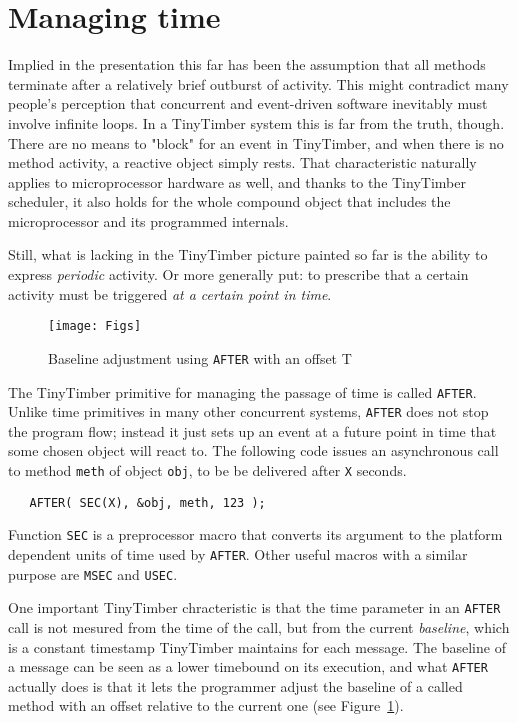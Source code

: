 \documentclass[12pt]{article}
\begin{document}
\section{Managing time}
\label{sect:time}

Implied in the presentation this far has been the assumption that all methods terminate after a relatively brief outburst of activity.  This might contradict many people's perception that concurrent and event-driven software inevitably must involve infinite loops.  In a TinyTimber system this is far from the truth, though.  There are no means to "block" for an event in TinyTimber, and when there is no method activity, a reactive object simply rests.  That characteristic naturally applies to microprocessor hardware as well, and thanks to the TinyTimber scheduler, it also holds for the whole compound object that includes the microprocessor and its programmed internals.

Still, what is lacking in the TinyTimber picture painted so far is the ability to express {\em periodic} activity.  Or more generally put: to prescribe that a certain activity must be triggered {\em at a certain point in time}.

\begin{figure}
\texttt{[image: Figs]}
\caption{\label{fig:after}Baseline adjustment using {\tt AFTER} with an offset T}
\end{figure}

The TinyTimber primitive for managing the passage of time is called {\tt AFTER}.  Unlike time primitives in many other concurrent systems, {\tt AFTER} does not stop the program flow; instead it just sets up an event at a future point in time that some chosen object will react to.  The following code issues an asynchronous call to method {\tt meth} of object {\tt obj}, to be be delivered after {\tt X} seconds.
\begin{verbatim}
   AFTER( SEC(X), &obj, meth, 123 );
\end{verbatim}
Function {\tt SEC} is a preprocessor macro that converts its argument to the platform dependent units of time used by {\tt AFTER}.  Other useful macros with a similar purpose are {\tt MSEC} and {\tt USEC}.

One important TinyTimber chracteristic is that the time parameter in an {\tt AFTER} call is not mesured from the time of the call, but from the current {\em baseline}, which is a constant timestamp TinyTimber maintains for each message.  The baseline of a message can be seen as a lower timebound on its execution, and what {\tt AFTER} actually does is that it lets the programmer adjust the baseline of a called method with an offset relative to the current one (see Figure~\ref{fig:after}).
\end{document}
